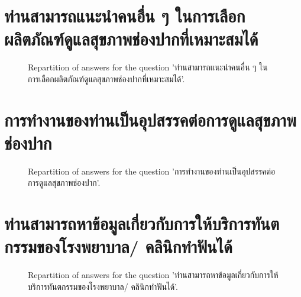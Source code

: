 \documentclass[12pt]{article}
\begin{document}
\clearpage{}
\section{ท่านสามารถแนะนำคนอื่น ๆ ในการเลือกผลิตภัณฑ์ดูแลสุขภาพช่องปากที่เหมาะสมได้}

\label{sec:111}


\begin{figure}[h!]
    \caption{\label{figure:q111-1}Repartition of answers for the question 'ท่านสามารถแนะนำคนอื่น ๆ ในการเลือกผลิตภัณฑ์ดูแลสุขภาพช่องปากที่เหมาะสมได้'.}
\end{figure}



\clearpage{}
\section{การทำงานของท่านเป็นอุปสรรคต่อการดูแลสุขภาพช่องปาก}

\label{sec:112}


\begin{figure}[h!]
    \caption{\label{figure:q112-1}Repartition of answers for the question 'การทำงานของท่านเป็นอุปสรรคต่อการดูแลสุขภาพช่องปาก'.}
\end{figure}



\clearpage{}
\section{ท่านสามารถหาข้อมูลเกี่ยวกับการให้บริการทันตกรรมของโรงพยาบาล/ คลินิกทำฟันได้}

\label{sec:113}


\begin{figure}[h!]
    \caption{\label{figure:q113-1}Repartition of answers for the question 'ท่านสามารถหาข้อมูลเกี่ยวกับการให้บริการทันตกรรมของโรงพยาบาล/ คลินิกทำฟันได้'.}
\end{figure}
\end{document}
